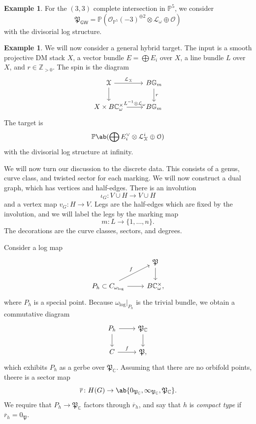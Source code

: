 \documentclass[10pt]{amsart}
\theoremstyle{definition}
\newtheorem{exm}[thm]{Example}
\theoremstyle{remark}
\theoremstyle{plain}
\theoremstyle{definition}
\theoremstyle{remark}
\newcommand{\G}{\mathbb{G}}
\newcommand{\C}{\mathbb{C}}
\newcommand{\Z}{\mathbb{Z}}
\renewcommand{\P}{\mathbb{P}}
\newcommand{\mc}[1]{\mathcal{#1}}
\newcommand{\mf}[1]{\mathfrak{#1}}
\newcommand{\ms}[1]{\mathsf{#1}}
\newcommand{\ol}[1]{\overline{#1}}
\newcommand{\1}{\mathbf{1}}
\newcommand{\2}{\mathbf{2}}
\newcommand{\3}{\mathbf{3}}
\newcommand{\GW}{\ms{GW}}
\begin{document}
\begin{exm}
    For the $(3,3)$ complete intersection in $\P^5$, we consider
    \[ \mf{P}_{\GW} = \P(\mc{O}_{\P^5}(-3)^{\oplus 2} \otimes \mc{L}_{\omega} \oplus \mc{O}) \]
    with the divisorial log structure.
\end{exm}

\begin{exm}
    We will now consider a general hybrid target. The input is a smooth projective DM stack $X$, a vector bundle $E = \bigoplus E_i$ over $X$, a line bundle $L$ over $X$, and $r \in \Z_{>0}$. The spin is the diagram
    \begin{equation*}
    \begin{tikzcd}
        \mc{X} \ar{r}{\mc{L}_{\mc{X}}} \ar{d} & B \G_m \ar{d}{r} \\
        X \times B \C_{\omega}^{\times} \ar{r}{L^{-1} \otimes \mc{L}_{\omega}} & B \G_m
    \end{tikzcd}
    \end{equation*}
    The target is
    \[ \P\ab(\bigoplus E_i^{\vee} \otimes \mc{L}_{\mc{X}}^i \oplus \mc{O}) \]
    with the divisorial log structure at infinity.
\end{exm}

We will now turn our discussion to the discrete data. This consists of a genus, curve class, and twisted sector for each marking. We will now construct a dual graph, which has vertices and half-edges. There is an involution 
\[\iota_G \colon V \cup H \to V \cup H \]
and a vertex map $v_G \colon H \to V$. Legs are the half-edges which are fixed by the involution, and we will label the legs by the marking map
\[ m \colon L \to \{1,\ldots,n\}. \]
The decorations are the curve classes, sectors, and degrees.

Consider a log map
\begin{equation*}
\begin{tikzcd}
    & \mf{P} \ar{d} \\
    P_h \subset C \ar{ur}{f} \ar{r}_{\omega_{\log}} & B \C_{\omega}^{\times},
\end{tikzcd}
\end{equation*}
where $P_h$ is a special point. Because $\omega_{\log}|_{P_h}$ is the trivial bundle, we obtain a commutative diagram
\begin{equation*}
\begin{tikzcd}
    P_h \ar{r} \ar{d} & \mf{P}_{\C} \ar{d} \\
    C \ar{r}{f} & \mf{P},
\end{tikzcd}
\end{equation*}
which exhibits $P_h$ as a gerbe over $\mf{P}_{\C}$. Assuming that there are no orbifold points, theere is a sector map
\[ \ol{r} \colon H(G) \to \ab\{ 0_{\mf{P}_{\C}}, \infty_{\mf{P}_{\C}}, \mf{P}_{\C}\}. \]
We require that $P_h \to \mf{P}_{\C}$ factors through $\ol{r}_h$, and say that $h$ is \textit{compact type} if $\ol{r}_h = 0_{\mf{P}}$.
\end{document}
